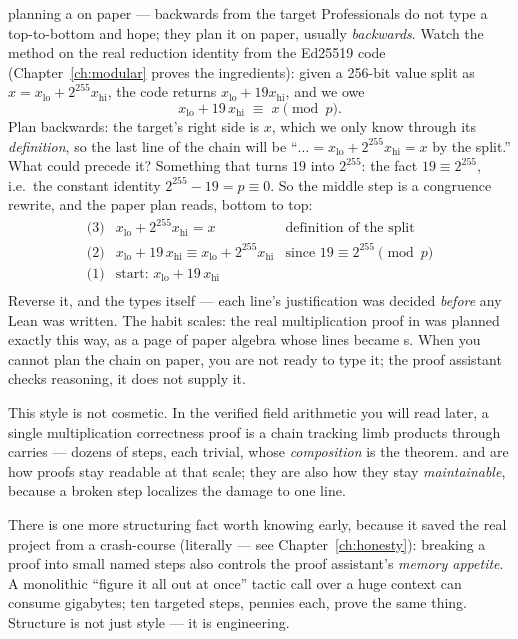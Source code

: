 \begin{worked}{planning a  on paper --- backwards from the target}
Professionals do not type a  top-to-bottom and hope; they plan
it on paper, usually \emph{backwards}. Watch the method on the real
reduction identity from the Ed25519 code (Chapter~\ref{ch:modular} proves
the ingredients): given a 256-bit value split as
$x = x_{\mathrm{lo}} + 2^{255} x_{\mathrm{hi}}$, the code returns
$x_{\mathrm{lo}} + 19 x_{\mathrm{hi}}$, and we owe
\[
x_{\mathrm{lo}} + 19\, x_{\mathrm{hi}}
\;\equiv\;
x \pmod{p}.
\]
Plan backwards: the target's right side is $x$, which we only know through
its \emph{definition}, so the last line of the chain will be
``$\ldots = x_{\mathrm{lo}} + 2^{255} x_{\mathrm{hi}} = x$ by the split.''
What could precede it? Something that turns $19$ into $2^{255}$: the fact
$19 \equiv 2^{255}$, i.e.\ the constant identity $2^{255} - 19 = p
\equiv 0$. So the middle step is a congruence rewrite, and the paper plan
reads, bottom to top:
\[
\begin{array}{lll}
\text{(3)} & x_{\mathrm{lo}} + 2^{255} x_{\mathrm{hi}} = x & \text{definition of the split}\\
\text{(2)} & x_{\mathrm{lo}} + 19\, x_{\mathrm{hi}} \equiv x_{\mathrm{lo}} + 2^{255} x_{\mathrm{hi}} & \text{since } 19 \equiv 2^{255} \pmod p\\
\text{(1)} & \text{start: } x_{\mathrm{lo}} + 19\, x_{\mathrm{hi}} & \\
\end{array}
\]
Reverse it, and the  types itself --- each line's justification
was decided \emph{before} any Lean was written. The habit scales: the real
multiplication proof in  was planned exactly
this way, as a page of paper algebra whose lines became s. When
you cannot plan the chain on paper, you are not ready to type it; the
proof assistant checks reasoning, it does not supply it.
\end{worked}

This style is not cosmetic. In the verified field arithmetic you will read
later, a single multiplication correctness proof is a  chain
tracking limb products through carries --- dozens of steps, each trivial,
whose \emph{composition} is the theorem.  and  are how
proofs stay readable at that scale; they are also how they stay
\emph{maintainable}, because a broken step localizes the damage to one line.

There is one more structuring fact worth knowing early, because it saved the
real project from a crash-course (literally --- see
Chapter~\ref{ch:honesty}): breaking a proof into small named 
steps also controls the proof assistant's \emph{memory appetite}. A monolithic
``figure it all out at once'' tactic call over a huge context can consume
gigabytes; ten targeted steps, pennies each, prove the same thing. Structure
is not just style --- it is engineering.

